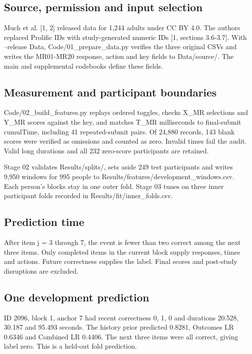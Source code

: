 \documentclass[10pt]{article}
\begin{document}
\subsection*{Source, permission and input selection}
Much et al. [1, 2] released data for 1,244 adults under CC BY 4.0. The authors replaced Prolific IDs with study-generated numeric IDs [1, sections 3.6-3.7]. With --release Data, Code/01\_prepare\_data.py verifies the three original CSVs and writes the MR01-MR20 response, action and key fields to Data/source/. The main and supplemental codebooks define these fields.

\subsection*{Measurement and participant boundaries}
Code/02\_build\_features.py replays ordered toggles, checks X\_MR selections and Y\_MR scores against the key, and matches T\_MR milliseconds to final-submit cumulTime, including 41 repeated-submit pairs. Of 24,880 records, 143 blank scores were verified as omissions and counted as zero. Invalid times fail the audit. Valid long durations and all 232 zero-score participants are retained.

Stage 02 validates Results/splits/, sets aside 249 test participants and writes 9,950 windows for 995 people to Results/features/development\_windows.csv. Each person's blocks stay in one outer fold. Stage 03 tunes on three inner participant folds recorded in Results/fit/inner\_folds.csv.

\subsection*{Prediction time}
After item j = 3 through 7, the event is fewer than two correct among the next three items. Only completed items in the current block supply responses, times and actions. Future correctness supplies the label. Final scores and post-study disruptions are excluded.

\subsection*{One development prediction}
ID 2096, block 1, anchor 7 had recent correctness 0, 1, 0 and durations 20.528, 30.187 and 95.493 seconds. The history prior predicted 0.8281, Outcomes LR 0.6346 and Combined LR 0.4406. The next three items were all correct, giving label zero. This is a held-out fold prediction.
\end{document}
